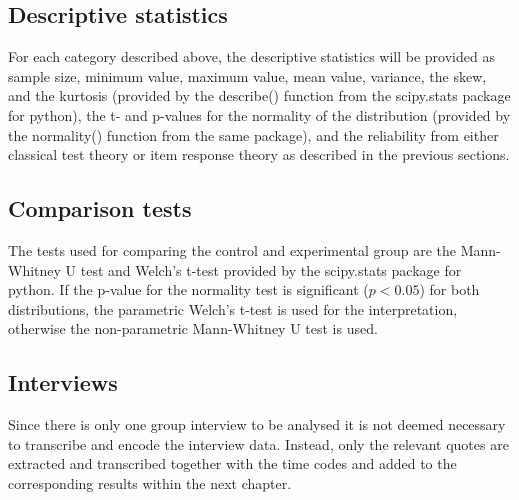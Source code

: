 \subsection{Descriptive statistics}

For each category described above, the descriptive statistics will be provided as sample size, minimum value, maximum value, mean value, variance, the skew, and the kurtosis (provided by the describe() function from the scipy.stats package for python), the t- and p-values for the normality of the distribution (provided by the normality() function from the same package), and the reliability from either classical test theory or item response theory as described in the previous sections.

\subsection{Comparison tests}

The tests used for comparing the control and experimental group are the Mann-Whitney U test and Welch's t-test provided by the scipy.stats package for python. If the p-value for the normality test is significant ($p<0.05$) for both distributions, the parametric Welch's t-test is used for the interpretation, otherwise the non-parametric Mann-Whitney U test is used.

\subsection{Interviews}

Since there is only one group interview to be analysed it is not deemed necessary to transcribe and encode the interview data. Instead, only the relevant quotes are extracted and transcribed together with the time codes and added to the corresponding results within the next chapter.
